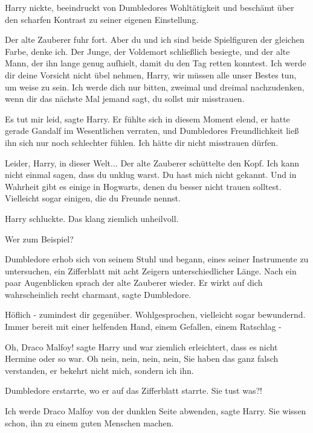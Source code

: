 Harry nickte, beeindruckt von Dumbledores Wohltätigkeit und beschämt über den
scharfen Kontrast zu seiner eigenen Einstellung.

Der alte Zauberer fuhr fort. \glqq Aber du und ich sind beide Spielfiguren der
gleichen Farbe, denke ich. Der Junge, der Voldemort schließlich besiegte, und
der alte Mann, der ihn lange genug aufhielt, damit du den Tag retten konntest.
Ich werde dir deine Vorsicht nicht übel nehmen, Harry, wir müssen alle unser
Bestes tun, um weise zu sein. Ich werde dich nur bitten, zweimal und dreimal
nachzudenken, wenn dir das nächste Mal jemand sagt, du sollst mir
misstrauen.\grqq{}

\glqq Es tut mir leid\grqq{}, sagte Harry. Er fühlte sich in diesem Moment
elend, er hatte gerade Gandalf im Wesentlichen verraten, und Dumbledores
Freundlichkeit ließ ihn sich nur noch schlechter fühlen. \glqq Ich hätte dir
nicht misstrauen dürfen.\grqq{}

\glqq Leider, Harry, in dieser Welt...\grqq{} Der alte Zauberer schüttelte den
Kopf. \glqq Ich kann nicht einmal sagen, dass du unklug warst. Du hast mich
nicht gekannt. Und in Wahrheit gibt es einige in Hogwarts, denen du besser nicht
trauen solltest. Vielleicht sogar einigen, die du Freunde nennst.\grqq{}

Harry schluckte. Das klang ziemlich unheilvoll.

\glqq Wer zum Beispiel?\grqq{}

Dumbledore erhob sich von seinem Stuhl und begann, eines seiner Instrumente zu
untersuchen, ein Zifferblatt mit acht Zeigern unterschiedlicher Länge. Nach ein
paar Augenblicken sprach der alte Zauberer wieder. \glqq Er wirkt auf dich
wahrscheinlich recht charmant\grqq{}, sagte Dumbledore.

\glqq Höflich - zumindest dir gegenüber. Wohlgesprochen, vielleicht sogar
bewundernd. Immer bereit mit einer helfenden Hand, einem Gefallen, einem
Ratschlag -\grqq{}

\glqq Oh, Draco Malfoy!\grqq{} sagte Harry und war ziemlich erleichtert, dass es
nicht Hermine oder so war. \glqq Oh nein, nein, nein, nein, Sie haben das ganz
falsch verstanden, er bekehrt nicht mich, sondern ich ihn.\grqq{}

Dumbledore erstarrte, wo er auf das Zifferblatt starrte. \glqq Sie tust
was?!\grqq{}

\glqq Ich werde Draco Malfoy von der dunklen Seite abwenden\grqq{}, sagte Harry.
\glqq Sie wissen schon, ihn zu einem guten Menschen machen.\grqq{}


